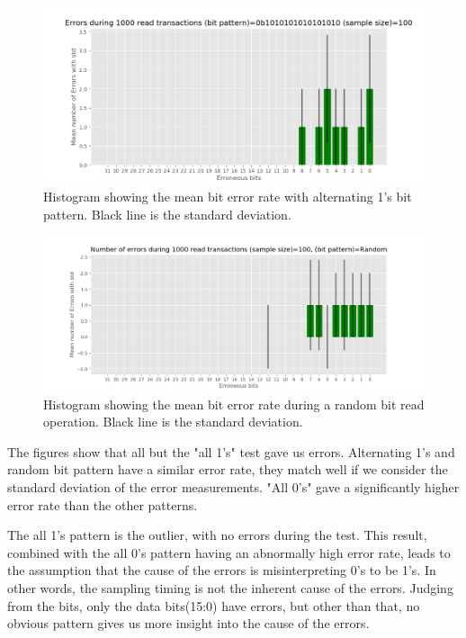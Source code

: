 \documentclass[main.tex]{subfiles}
\begin{document}
\begin{figure}[!ht]
    \centering
    \includegraphics[width=18cm]{images/error_rate_alternating_1s.png}
    \caption{Histogram showing the mean bit error rate with alternating 1's bit pattern. Black line is the standard deviation.}
    \label{fig: alternating_1_bit_rate}
\end{figure}
\FloatBarrier

\begin{figure}[!ht]
    \centering
    \includegraphics[width=18cm]{images/error_rate_random.png}
    \caption{Histogram showing the mean bit error rate during a random bit read operation. Black line is the standard deviation.}
    \label{fig: rand_bit_rate}
\end{figure}
\FloatBarrier

The figures show that all but the "all 1's" test gave us errors. Alternating 1's and random bit pattern have a similar error rate, they match well if we consider the standard deviation of the error measurements. "All 0's" gave a significantly higher error rate than the other patterns.


The all 1's pattern is the outlier, with no errors during the test. This result, combined with the all 0's pattern having an abnormally high error rate, leads to the assumption that the cause of the errors is misinterpreting 0's to be 1's. In other words, the sampling timing is not the inherent cause of the errors. Judging from the bits, only the data bits(15:0) have errors, but other than that, no obvious pattern gives us more insight into the cause of the errors.
\end{document}
